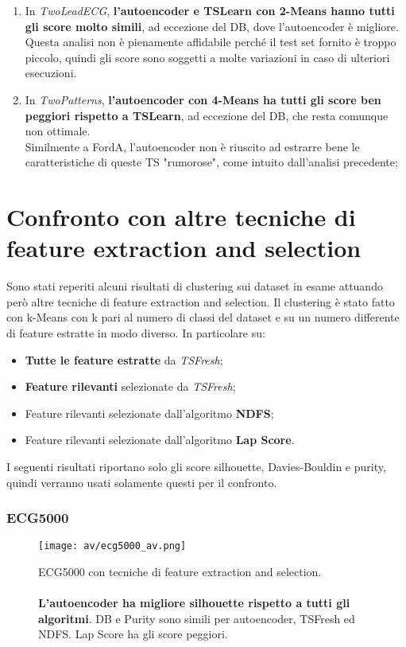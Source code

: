 \begin{enumerate}
	\item In \textit{TwoLeadECG}, \textbf{l'autoencoder e TSLearn con 2-Means hanno tutti gli score molto simili}, ad eccezione del DB, dove l'autoencoder è migliore.
	Questa analisi non è pienamente affidabile perché il test set fornito è troppo piccolo, quindi gli score sono soggetti a molte variazioni in caso di ulteriori esecuzioni.

	\item In \textit{TwoPatterns}, \textbf{l'autoencoder con 4-Means ha tutti gli score ben peggiori rispetto a TSLearn}, ad eccezione del DB, che resta comunque non ottimale.\\
	Similmente a FordA, l'autoencoder non è riuscito ad estrarre bene le caratteristiche di queste TS "rumorose", come intuito dall'analisi precedente;
\end{enumerate}

\section{Confronto con altre tecniche di feature extraction and selection}
Sono stati reperiti alcuni risultati di clustering sui dataset in esame attuando però altre tecniche di feature extraction and selection. Il clustering è stato fatto con k-Means con k pari al numero di classi del dataset e su un numero differente di feature estratte in modo diverso. 
In particolare su:
\begin{itemize}
	\item \textbf{Tutte le feature estratte} da \textit{TSFresh};
	\item \textbf{Feature rilevanti} selezionate da \textit{TSFresh};
	\item Feature rilevanti selezionate dall'algoritmo \textbf{NDFS};
	\item Feature rilevanti selezionate dall'algoritmo \textbf{Lap Score}.
\end{itemize}
I seguenti risultati riportano solo gli score silhouette, Davies-Bouldin e purity, quindi verranno usati solamente questi per il confronto.

\subsubsection{ECG5000}
\begin{figure}[H]
	\centering
	\texttt{[image: av/ecg5000\_av.png]}
	\caption{ECG5000 con tecniche di feature extraction and selection.\\
	\\
	\textbf{L'autoencoder ha migliore silhouette rispetto a tutti gli algoritmi}. DB e Purity sono simili per autoencoder, TSFresh ed NDFS. Lap Score ha gli score peggiori.}
	\label{fig:ecg5000_av}
\end{figure}

